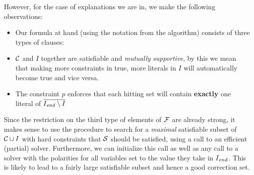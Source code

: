 However, for the case of explanations we are in, we make the following observations: 
\begin{itemize}
 \item Our formula at hand (using the notation from the \onestepo algorithm) consists of three types of clauses: 
 \item $\mathcal{C} $ and $I$ together are satisfiable and \emph{mutually supportive}, by this we mean that making more constraints in \formulac true, more literals in $I$ will automatically become true and vice versa. 
 \item The constraint $p$ enforces that each hitting set will contain \textbf{exactly} one literal of  $\overline{I_\mathit{end} \setminus I}$
\end{itemize}
Since the restriction on the third type of elements of $\mathcal{F} $ are already strong, it makes sense to use the \grow procedure to search for a \emph{maximal} satisfiable subset of $\mathcal{C} \cup I$ with hard constraints that $\mathcal{S}$ should be satisfied, using a call to an efficient  (partial) \maxsat solver. Furthermore, we can initialize this call as well as any call to a \sat solver with the polarities for all variables set to the value they take in $I_\mathit{end} $. This is likely to lead to a fairly large satisfiable subset and hence a good correction set. 






